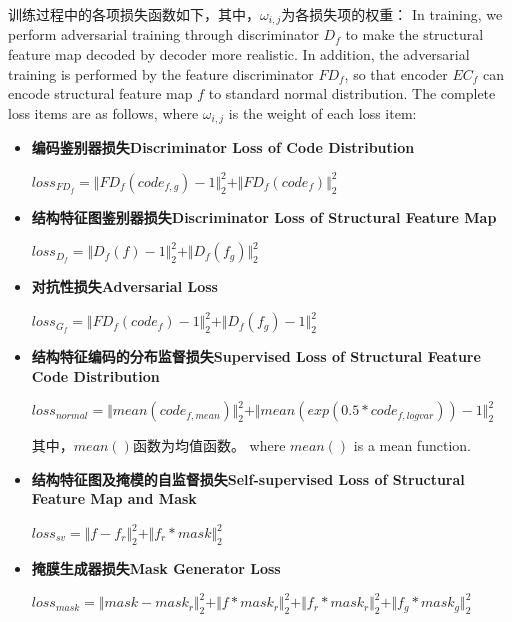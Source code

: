 \documentclass[letterpaper]{article} %
\begin{document}
训练过程中的各项损失函数如下，其中，$\omega_{i,j}$为各损失项的权重：
In training, we perform adversarial training through discriminator $D_f$ to make the structural feature map decoded by decoder more realistic. In addition, the adversarial training is performed by the feature discriminator $FD_f$, so that encoder $EC_f$ can encode structural feature map $f$ to standard normal distribution. The complete loss items are as follows, where $\omega_{i,j}$ is the weight of each loss item: 
\begin{itemize}
	\item \textbf{编码鉴别器损失Discriminator Loss of Code Distribution } 
	\begin{center}
		$loss_{FD_f}=\Vert{FD_f(code_{f,g})-1}\Vert_{2}^{2}+\Vert{FD_f(code_f)}\Vert_{2}^{2}$
	\end{center}
	
	\item \textbf{结构特征图鉴别器损失Discriminator Loss of Structural Feature Map} 
	\begin{center}
		$loss_{D_f}=\Vert{D_f(f)-1}\Vert_{2}^{2}+\Vert{D_f(f_g )}\Vert_{2}^{2}$
	\end{center}
	
	\item \textbf{对抗性损失Adversarial Loss} 
	\begin{center}
		$loss_{G_f}=\Vert{FD_f(code_f)-1}\Vert_{2}^{2}+\Vert{D_f(f_g)-1}\Vert_{2}^{2}$
	\end{center}
	
	\item \textbf{结构特征编码的分布监督损失Supervised Loss of Structural Feature Code Distribution} 
	\begin{center}
		$loss_{normal}=\Vert{mean(code_{f,mean})}\Vert_{2}^{2}+ \Vert{mean(exp(0.5*code_{f,logvar}))-1}\Vert_{2}^{2}$
	\end{center}
	其中，$mean()$函数为均值函数。
	where $mean()$ is a mean function.
	
	\item \textbf{结构特征图及掩模的自监督损失Self-supervised Loss of Structural Feature Map and Mask} 
	\begin{center}
		$loss_{sv}=\Vert{f-f_r}\Vert_{2}^{2}+\Vert{f_r*mask}\Vert_{2}^{2}$
	\end{center}
	
	\item \textbf{掩膜生成器损失Mask Generator Loss}
	\begin{center}
		$loss_{mask}=\Vert{mask-mask_r }\Vert_{2}^{2}+\Vert{f*mask_r}\Vert_{2}^{2}+\Vert{f_r*mask_r}\Vert_{2}^{2}+\Vert{f_g*mask_g}\Vert_{2}^{2}$
	\end{center}
\end{itemize}
\end{document}
